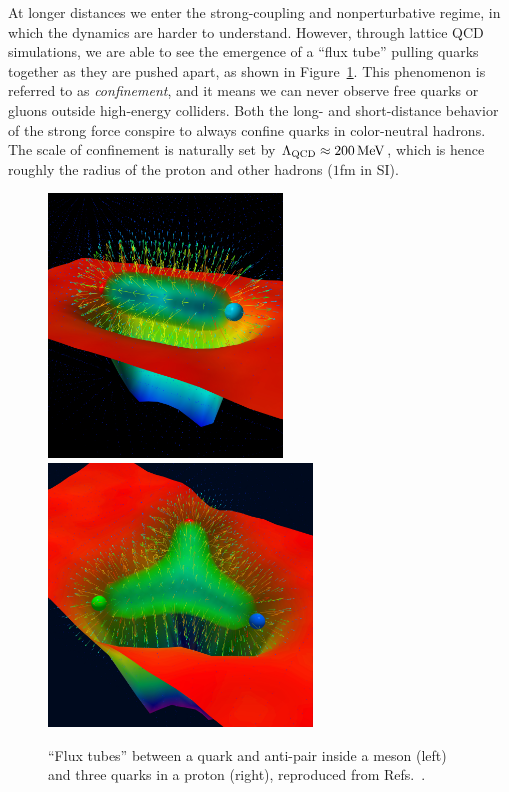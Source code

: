 At longer distances we enter the strong-coupling and nonperturbative regime, in which the dynamics are harder to understand.
However, through lattice QCD simulations, we are able to see the emergence of a ``flux tube'' pulling quarks together as they are pushed apart, as shown in Figure~\ref{fig:01_sm_qcd_fluxtubes}.
This phenomenon is referred to as \textit{confinement}, and it means we can never observe free quarks or gluons outside high-energy colliders.
Both the long- and short-distance behavior of the strong force conspire to always confine quarks in color-neutral hadrons.
The scale of confinement is naturally set by $\Lambda_{\mathrm{QCD}} \approx 200 \,\text{Me\hspace{-.08em}V}$, which is hence roughly the radius of the proton and other hadrons ($1$fm in SI).

\begin{figure}[ht]
	\centering
	\includegraphics[height=7cm]{figures/01-SM-03-SM/qcd/FluxTube.jpg}
	\hspace{2mm}
	\includegraphics[height=7cm]{figures/01-SM-03-SM/qcd/VacuumRespAction16t32_YshapeCSSMcover.jpg}
	\caption{``Flux tubes'' between a quark and anti-pair inside a meson (left) and three quarks in a proton (right), reproduced from Refs.~\cite{Bissey:2006bz, LeinweberVisualQCD}.}
	\label{fig:01_sm_qcd_fluxtubes}
\end{figure}


